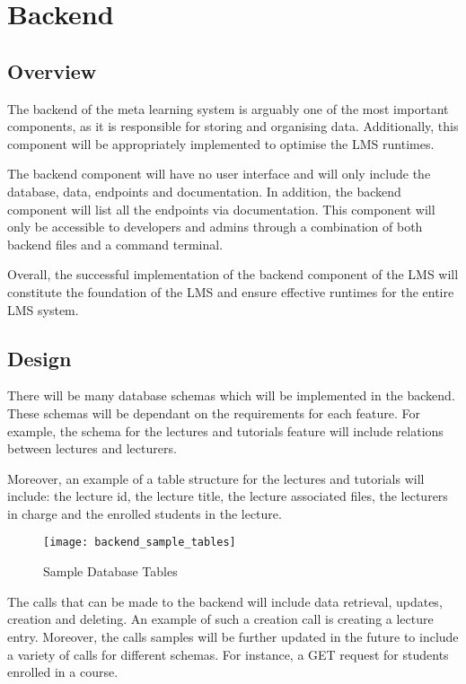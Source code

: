 \section{Backend}
\subsection{Overview}
The backend of the meta learning system is arguably one of the most important components, as it is responsible for storing and 
organising data. Additionally, this component will be appropriately implemented to optimise the LMS runtimes.

The backend component will have no user interface and will only include the database, data, endpoints and documentation. In addition, 
the backend component will list all the endpoints via documentation. This component will only be accessible to developers and admins through 
a combination of both backend files and a command terminal.

Overall, the successful implementation of the backend component of the LMS will constitute the foundation of the LMS and 
ensure effective runtimes for the entire LMS system.

\subsection{Design}
There will be many database schemas which will be implemented in the backend. These schemas will be dependant on the requirements for each 
feature. For example, the schema for the lectures and tutorials feature will include relations between lectures and lecturers.  

Moreover, an example of a table structure for the lectures and tutorials will include: the lecture id, the lecture title, the 
lecture associated files, the lecturers in charge and the enrolled students in the lecture. 

\begin{figure}[h!]
    \centering
    \texttt{[image: backend\_sample\_tables]}
    \caption{Sample Database Tables}
\end{figure}

The calls that can be made to the backend will include data retrieval, updates, creation and deleting. An example of such a 
creation call is creating a lecture entry. Moreover, the calls samples will be further updated in the future to include a variety 
of calls for different schemas. For instance, a GET request for students enrolled in a course.

